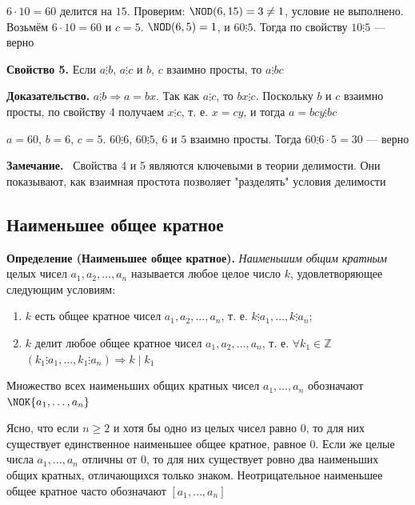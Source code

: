 \documentclass[a4paper,12pt]{article}
\newcommand{\myremark}{\textbf{Замечание.}\ }
\theoremstyle{definition}
\theoremstyle{plain}
\theoremstyle{remark}
\begin{document}
	\begin{tcolorbox}[colback=gray!5, colframe=gray!50, title=Пример]
	$6 \cdot 10 = 60$ делится на $15$. Проверим: $\NOD(6,15)=3 \neq 1$, условие не выполнено.
	Возьмём $6 \cdot 10 = 60$ и $c = 5$. $\NOD(6,5)=1$, и $60 \vdots 5$. Тогда по свойству $10 \vdots 5$ — верно
	\end{tcolorbox}
	
	\medskip
	\noindent \textbf{Свойство 5.}
	Если $a \vdots b$, $a \vdots c$ и $b$, $c$ взаимно просты, то $a \vdots bc$
	
	\medskip
	\noindent \textbf{Доказательство.}
	$a \vdots b \Rightarrow a = bx$. Так как $a \vdots c$, то $bx \vdots c$. Поскольку $b$ и $c$ взаимно просты, по свойству 4 получаем $x \vdots c$, т. е. $x = cy$, и тогда $a = bcy \vdots bc$
	
	\begin{tcolorbox}[colback=gray!5, colframe=gray!50, title=Пример]
	$a = 60$, $b = 6$, $c = 5$. $60 \vdots 6$, $60 \vdots 5$, $6$ и $5$ взаимно просты. Тогда $60 \vdots 6 \cdot 5 = 30$ — верно
	\end{tcolorbox}
	
	\myremark
	Свойства 4 и 5 являются ключевыми в теории делимости. Они показывают, как взаимная простота позволяет "разделять" условия делимости
	
	\subsection{Наименьшее общее кратное}
	
	\noindent \textbf{Определение (Наименьшее общее кратное).}
	\textit{Наименьшим общим кратным} целых чисел $a_1, a_2, \dots, a_n$ называется любое целое число $k$, удовлетворяющее следующим условиям:
	\begin{enumerate}
	\item $k$ есть общее кратное чисел $a_1, a_2, \dots, a_n$, т. е. $k \vdots a_1, \dots, k \vdots a_n$;
	\item $k$ делит любое общее кратное чисел $a_1, a_2, \dots, a_n$, т. е. $\forall k_1 \in \mathbb{Z}$ $(k_1 \vdots a_1, \dots, k_1 \vdots a_n) \Rightarrow k \mid k_1$
	\end{enumerate}
	
	Множество всех наименьших общих кратных чисел $a_1, \dots, a_n$ обозначают $\NOK\{a_1, \dots, a_n\}$
	
	\begin{tcolorbox}[colback=blue!5, colframe=blue!40!black, title=Замечание о существовании]
	Ясно, что если $n \geq 2$ и хотя бы одно из целых чисел равно $0$, то для них существует единственное наименьшее общее кратное, равное $0$. Если же целые числа $a_1, \dots, a_n$ отличны от $0$, то для них существует ровно два наименьших общих кратных, отличающихся только знаком. Неотрицательное наименьшее общее кратное часто обозначают $[a_1, \dots, a_n]$
	\end{tcolorbox}
	
\end{document}
